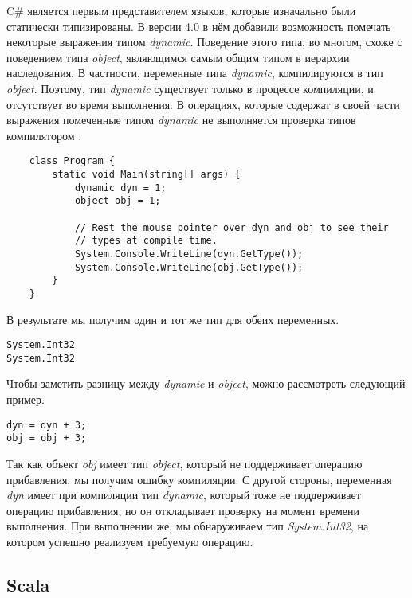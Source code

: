     C{\#} является первым представителем языков, которые изначально были статически типизированы. В версии 4.0 в нём добавили возможность помечать некоторые выражения типом \textit{dynamic}. Поведение этого типа, во многом, схоже с поведением типа \textit{object}, являющимся самым общим типом в иерархии наследования. В частности, переменные типа \textit{dynamic}, компилируются в тип \textit{object}. Поэтому, тип  \textit{dynamic} существует только в процессе компиляции, и отсутствует во время выполнения. В операциях, которые содержат в своей части выражения помеченные типом \textit{dynamic} не выполняется проверка типов компилятором \cite{msdn:dynamicType}.

\begin{verbatim}
    class Program {
        static void Main(string[] args) {
            dynamic dyn = 1;
            object obj = 1;

            // Rest the mouse pointer over dyn and obj to see their
            // types at compile time.
            System.Console.WriteLine(dyn.GetType());
            System.Console.WriteLine(obj.GetType());
        }
    }
\end{verbatim}

В результате мы получим один и тот же тип для обеих переменных.
\begin{verbatim}
System.Int32
System.Int32
\end{verbatim}
    Чтобы заметить разницу между \textit{dynamic} и \textit{object}, можно рассмотреть следующий пример.

\begin{verbatim}
dyn = dyn + 3;  
obj = obj + 3;  
\end{verbatim}

Так как объект \textit{obj} имеет тип \textit{object}, который не поддерживает операцию прибавления, мы получим ошибку компиляции. С другой стороны, переменная \textit{dyn} имеет при компиляции тип \textit{dynamic}, который тоже не поддерживает операцию прибавления, но он откладывает проверку на момент времени выполнения. При выполнении же, мы обнаруживаем тип \textit{System.Int32}, на котором успешно реализуем требуемую операцию.

\subsection{Scala}

